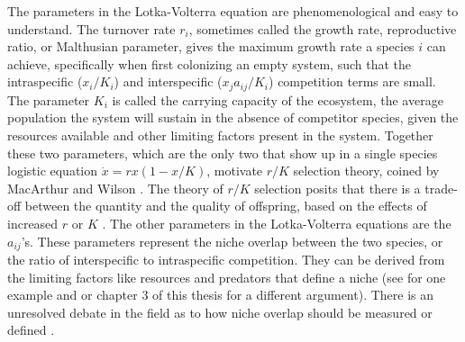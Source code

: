 The parameters in the Lotka-Volterra equation are phenomenological and easy to understand. 
The turnover rate $r_i$, sometimes called the growth rate, reproductive ratio, or Malthusian parameter, gives the maximum growth rate a species $i$ can achieve, specifically when first colonizing an empty system, such that the intraspecific ($x_i/K_i$) and interspecific ($x_j a_{ij}/K_i$) competition terms are small. 
The parameter $K_i$ is called the carrying capacity of the ecosystem, the average population the system will sustain in the absence of competitor species, given the resources available and other limiting factors present in the system. 
Together these two parameters, which are the only two that show up in a single species logistic equation $\dot{x}=rx(1-x/K)$, motivate $r/K$ selection theory, coined by MacArthur and Wilson \cite{MacArthur1967a}. 
The theory of $r/K$ selection posits that there is a trade-off between the quantity and the quality of offspring, based on the effects of increased $r$ or $K$ \cite{MacArthur1967a}. 
%
The other parameters in the Lotka-Volterra equations are the $a_{ij}$'s. 
These parameters represent the niche overlap between the two species, or the ratio of interspecific to intraspecific competition. 
They can be derived from the limiting factors like resources and predators that define a niche (see \cite{MacArthur1967} for one example and \cite{MacArthur1970} or chapter 3 of this thesis for a different argument). %
There is an unresolved debate in the field as to how niche overlap should be measured or defined \cite{Klopfer1961,Pianka1973,Pianka1974,Abrams1977,Hurlbert1978,Connell1980,Abrams1980,Schoener1985,Chesson1990,Leibold1995,Chesson2008}. %
